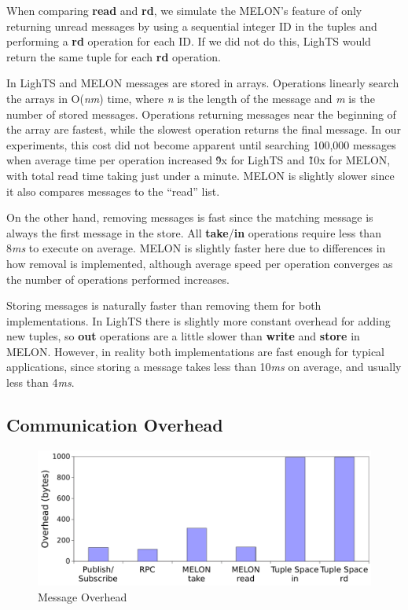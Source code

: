 \documentclass[lnicst]{svmultln}
\begin{document}
When comparing \textbf{read} and \textbf{rd}, we simulate the MELON's feature of only returning unread messages by using a sequential integer ID in the tuples and performing a \textbf{rd} operation for each ID. If we did not do this, LighTS would return the same tuple for each \textbf{rd} operation.

In LighTS and MELON messages are stored in arrays. Operations linearly search the arrays in O(\textit{nm}) time, where \textit{n} is the length of the message and \textit{m} is the number of stored messages. Operations returning messages near the beginning of the array are fastest, while the slowest operation returns the final message. In our experiments, this cost did not become apparent until searching 100,000 messages when average time per operation increased \~9x for LighTS and \~10x for MELON, with total read time taking just under a minute. MELON is slightly slower since it also compares messages to the ``read'' list.

On the other hand, removing messages is fast since the matching message is always the first message in the store. All \textbf{take}/\textbf{in} operations require less than 8\textit{ms} to execute on average. MELON is slightly faster here due to differences in how removal is implemented, although average speed per operation converges as the number of operations performed increases.

Storing messages is naturally faster than removing them for both implementations. In LighTS there is slightly more constant overhead for adding new tuples, so \textbf{out} operations are a little slower than \textbf{write} and \textbf{store} in MELON.  However, in reality both implementations are fast enough for typical applications, since storing a message takes less than 10\textit{ms} on average, and usually less than 4\textit{ms}.

\subsection{Communication Overhead}\label{sec:overhead}

\begin{figure}
\centering
\includegraphics[scale = .34, clip, trim = 0px 0px 0px 0px]{figures/overhead.pdf}
\caption{Message Overhead}
\label{fig:overhead}
\end{figure}
\end{document}
